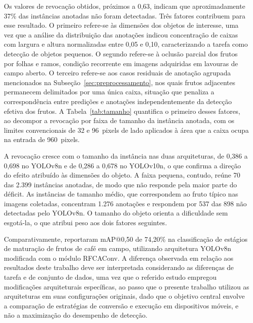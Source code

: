 \documentclass[artigo,times,capa]{iftex2024}
\begin{document}
Os valores de revocação obtidos, próximos a 0,63, indicam que aproximadamente
37\% das instâncias anotadas não foram detectadas. Três fatores contribuem para
esse resultado. O primeiro refere-se às dimensões dos objetos de interesse, uma
vez que a análise da distribuição das anotações indicou concentração de caixas com largura
e altura normalizadas entre 0,05 e 0,10, caracterizando a tarefa como detecção
de objetos pequenos. O segundo refere-se à oclusão parcial dos frutos por folhas
e ramos, condição recorrente em imagens adquiridas em lavouras de campo aberto.
O terceiro refere-se aos casos residuais de anotação agrupada mencionados na
Subseção~\ref{sec:preprocessamento}, nos quais frutos adjacentes permanecem
delimitados por uma única caixa, situação que penaliza a correspondência entre predições e
anotações independentemente da detecção efetiva dos frutos. A
Tabela~\ref{tab:tamanho} quantifica o primeiro desses fatores, ao decompor a
revocação por faixa de tamanho da instância anotada, com os limites
convencionais de 32 e 96~pixels de lado aplicados à área que a caixa ocupa na
entrada de 960~pixels.



A revocação cresce com o tamanho da instância nas duas arquiteturas, de 0,386 a
0,698 no YOLOv8n e de 0,286 a 0,678 no YOLOv10n, o que confirma a direção do
efeito atribuído às dimensões do objeto. A faixa pequena, contudo, reúne 70 das
2.399 instâncias anotadas, de modo que não responde pela maior parte do
déficit. As instâncias de tamanho médio, que correspondem ao fruto típico nas
imagens coletadas, concentram 1.276 anotações e respondem por 537 das 898 não
detectadas pelo YOLOv8n. O tamanho do objeto orienta a dificuldade sem
esgotá-la, o que atribui peso aos dois fatores seguintes.

Comparativamente, \textcite{Kazama2024Monitoring} reportaram \ac{mAP}@0,50 de
74,20\% na classificação de estágios de maturação de frutos de café em campo,
utilizando arquitetura YOLOv8n modificada com o módulo RFCAConv. A diferença
observada em relação aos resultados deste trabalho deve ser interpretada
considerando as diferenças de tarefa e de conjunto de dados, uma vez que o
referido estudo empregou modificações arquiteturais específicas, ao passo que o
presente trabalho utilizou as arquiteturas em suas configurações originais, dado
que o objetivo central envolve a comparação de estratégias de conversão e execução em
dispositivos móveis, e não a maximização do desempenho de detecção.
\end{document}
